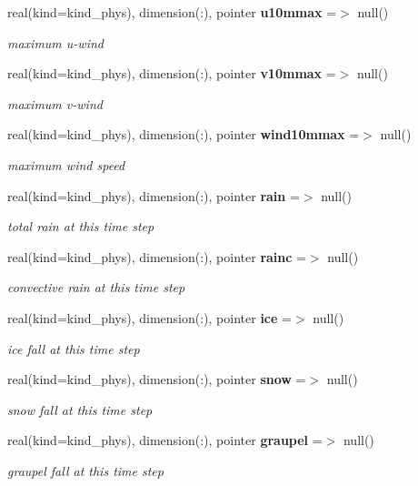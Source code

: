 \begin{DoxyCompactItemize}
real(kind=kind\+\_\+phys), dimension(\+:), pointer \textbf{ u10mmax} =$>$ null()
\begin{DoxyCompactList}\small\item\em maximum u-\/wind \end{DoxyCompactList}\item 
real(kind=kind\+\_\+phys), dimension(\+:), pointer \textbf{ v10mmax} =$>$ null()
\begin{DoxyCompactList}\small\item\em maximum v-\/wind \end{DoxyCompactList}\item 
real(kind=kind\+\_\+phys), dimension(\+:), pointer \textbf{ wind10mmax} =$>$ null()
\begin{DoxyCompactList}\small\item\em maximum wind speed \end{DoxyCompactList}\item 
real(kind=kind\+\_\+phys), dimension(\+:), pointer \textbf{ rain} =$>$ null()
\begin{DoxyCompactList}\small\item\em total rain at this time step \end{DoxyCompactList}\item 
real(kind=kind\+\_\+phys), dimension(\+:), pointer \textbf{ rainc} =$>$ null()
\begin{DoxyCompactList}\small\item\em convective rain at this time step \end{DoxyCompactList}\item 
real(kind=kind\+\_\+phys), dimension(\+:), pointer \textbf{ ice} =$>$ null()
\begin{DoxyCompactList}\small\item\em ice fall at this time step \end{DoxyCompactList}\item 
real(kind=kind\+\_\+phys), dimension(\+:), pointer \textbf{ snow} =$>$ null()
\begin{DoxyCompactList}\small\item\em snow fall at this time step \end{DoxyCompactList}\item 
real(kind=kind\+\_\+phys), dimension(\+:), pointer \textbf{ graupel} =$>$ null()
\begin{DoxyCompactList}\small\item\em graupel fall at this time step \end{DoxyCompactList}\item 

\end{DoxyCompactItemize}
